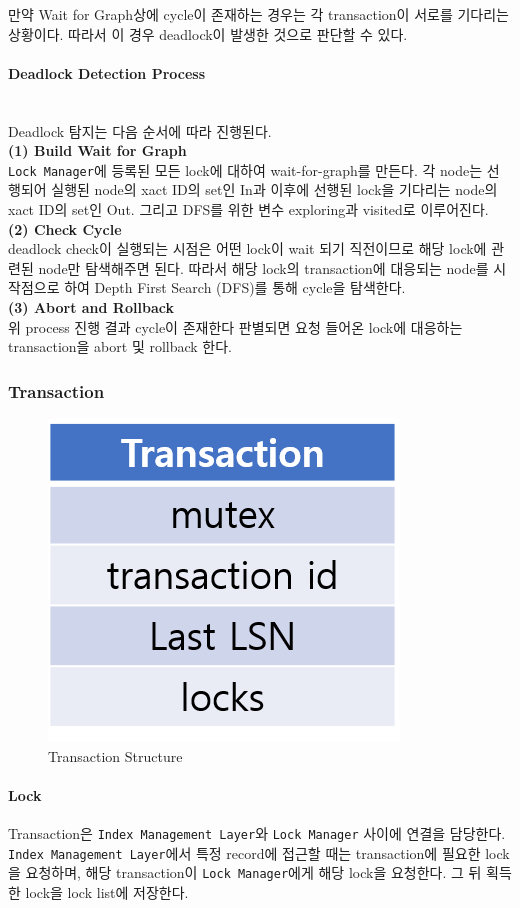 \documentclass[main.tex]{subfiles}
\begin{document}
\noindent 만약 Wait for Graph상에 cycle이 존재하는 경우는 각 transaction이 서로를 기다리는 상황이다. 따라서 이 경우 deadlock이 발생한 것으로 판단할 수 있다.

\paragraph{Deadlock Detection Process}\mbox{}\\
Deadlock 탐지는 다음 순서에 따라 진행된다.\mbox{}\\

\noindent \textbf{(1) Build Wait for Graph}\\
\indent \texttt{Lock Manager}에 등록된 모든 lock에 대하여 wait-for-graph를 만든다. 각 node는 선행되어 실행된 node의 xact ID의 set인 In과 이후에 선행된 lock을 기다리는 node의 xact ID의 set인 Out. 그리고 DFS를 위한 변수 exploring과 visited로 이루어진다.
\mbox{}\\

\noindent \textbf{(2) Check Cycle}\\
\indent deadlock check이 실행되는 시점은 어떤 lock이 wait 되기 직전이므로 해당 lock에 관련된 node만 탐색해주면 된다. 따라서 해당 lock의 transaction에 대응되는 node를 시작점으로 하여 Depth First Search (DFS)를 통해 cycle을 탐색한다.
\mbox{}\\

\noindent \textbf{(3) Abort and Rollback}\\
\indent 위 process 진행 결과 cycle이 존재한다 판별되면 요청 들어온 lock에 대응하는 transaction을 abort 및 rollback 한다.
\mbox{}\\

\subsubsection{Transaction}
\begin{figure}[!hbt]
	\centering
	\includegraphics[width=.3\textwidth]{images/cc/transaction.png}
	\caption{Transaction Structure}
\end{figure}

\paragraph{Lock}
Transaction은 \texttt{Index Management Layer}와 \texttt{Lock Manager} 사이에 연결을 담당한다.
\texttt{Index Management Layer}에서 특정 record에 접근할 때는 transaction에 필요한 lock을 요청하며,
해당 transaction이 \texttt{Lock Manager}에게 해당 lock을 요청한다. 그 뒤 획득한 lock을 lock list에 저장한다.
\end{document}
